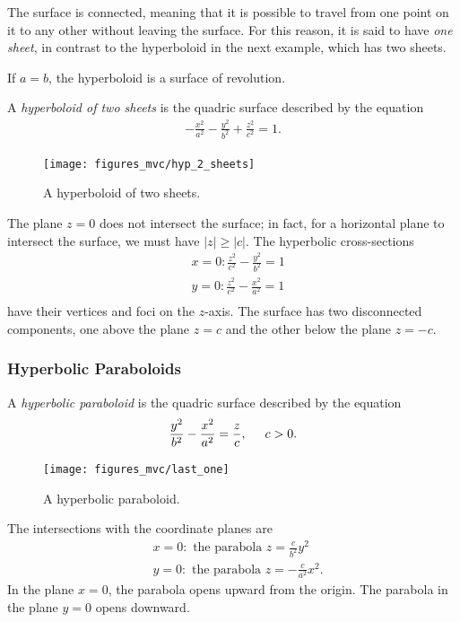 \documentclass[12pt,letterpaper,reqno]{article}
\numberwithin{equation}{section}
\begin{document}
{The surface is connected, meaning that it is possible to travel from one point on it to any other without leaving the surface. For this reason, it is said to have \emph{one sheet}, in contrast to the hyperboloid in the next example, which has two sheets.

If $a=b$, the hyperboloid is a surface of revolution. 

\begin{defn}
	A \emph{hyperboloid of two sheets} is the quadric surface described by the equation
	\begin{align*}
		-\frac{x^2}{a^2}-\frac{y^2}{b^2}+\frac{z^2}{c^2}=1.
	\end{align*}
\end{defn}

\begin{figure}[h]
	\begin{center}
		\texttt{[image: figures\_mvc/hyp\_2\_sheets]}
	\end{center}
	\caption{A hyperboloid of two sheets.}
\end{figure}

The plane $z=0$ does not intersect the surface; in fact, for a horizontal plane to intersect the surface, we must have $|z|\geq |c|$. The hyperbolic cross-sections 
\begin{align*}
	&x=0: \frac{z^2}{c^2}-\frac{y^2}{b^2}=1 \\
	&y=0: \frac{z^2}{c^2}-\frac{x^2}{a^2}=1 \\
\end{align*}
have their vertices and foci on the $z$-axis. The surface has two disconnected components, one above the plane $z=c$ and the other below the plane $z=-c$.

\subsubsection{Hyperbolic Paraboloids}
\begin{defn}
	A \emph{hyperbolic paraboloid} is the quadric surface described by the equation
	\begin{align*}
		\frac{y^2}{b^2}-\frac{x^2}{a^2}=\frac{z}{c}, \hspace{0.5cm} c>0.
	\end{align*}
\end{defn}
\begin{figure}[h]
	\begin{center}
		\texttt{[image: figures\_mvc/last\_one]}
	\end{center}
	\caption{A hyperbolic paraboloid.}
\end{figure}
The intersections with the coordinate planes are
\begin{align*}
	&x=0: \text{ the parabola } z=\frac{c}{b^2}y^2 \\
	&y=0: \text{ the parabola } z=-\frac{c}{a^2}x^2. 
\end{align*}
In the plane $x=0$, the parabola opens upward from the origin. The parabola in the plane $y=0$ opens downward.

}
\end{document}
